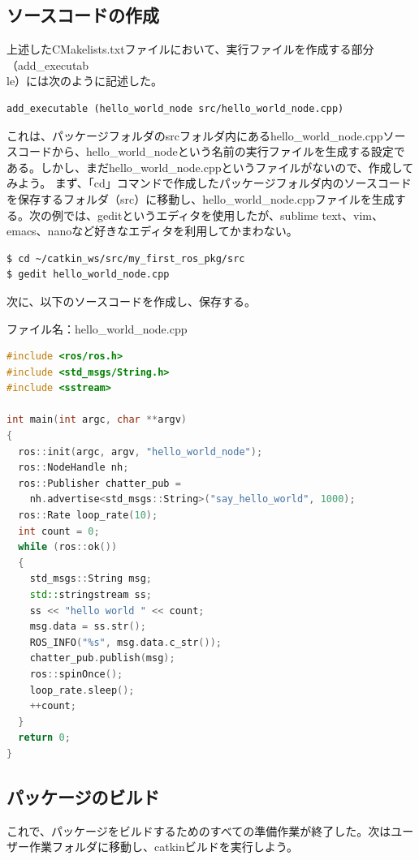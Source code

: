 \subsection{ソースコードの作成}
上述したCMakelists.txtファイルにおいて、実行ファイルを作成する部分（add\_executab\\le）には次のように記述した。

\begin{lstlisting}[language=ROS]
add_executable (hello_world_node src/hello_world_node.cpp)
\end{lstlisting}

これは、パッケージフォルダのsrcフォルダ内にあるhello\_world\_node.cppソースコードから、hello\_world\_nodeという名前の実行ファイルを生成する設定である。しかし、まだhello\_world\_node.cppというファイルがないので、作成してみよう。
まず、「cd」コマンドで作成したパッケージフォルダ内のソースコードを保存するフォルダ（src）に移動し、hello\_world\_node.cppファイルを生成する。次の例では、geditというエディタを使用したが、sublime text、vim、emacs、nanoなど好きなエディタを利用してかまわない。

\begin{lstlisting}[language=ROS]
$ cd ~/catkin_ws/src/my_first_ros_pkg/src
$ gedit hello_world_node.cpp
\end{lstlisting}

次に、以下のソースコードを作成し、保存する。

ファイル名：hello\_world\_node.cpp

\begin{lstlisting}[language=C++]
#include <ros/ros.h>
#include <std_msgs/String.h>
#include <sstream>

int main(int argc, char **argv)
{
  ros::init(argc, argv, "hello_world_node");
  ros::NodeHandle nh;
  ros::Publisher chatter_pub =
    nh.advertise<std_msgs::String>("say_hello_world", 1000);
  ros::Rate loop_rate(10);
  int count = 0;
  while (ros::ok())
  {
    std_msgs::String msg;
    std::stringstream ss;
    ss << "hello world " << count;
    msg.data = ss.str();
    ROS_INFO("%s", msg.data.c_str());
    chatter_pub.publish(msg);
    ros::spinOnce();
    loop_rate.sleep();
    ++count;
  }
  return 0;
}
\end{lstlisting}

\subsection{パッケージのビルド}
これで、パッケージをビルドするためのすべての準備作業が終了した。次はユーザー作業フォルダに移動し、catkinビルドを実行しよう。


